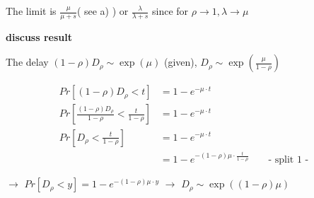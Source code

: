 The limit is $\frac{\mu }{\mu +s}$( see a) ) or $\frac{\lambda }{\lambda +s}$ since for $\rho \rightarrow 1, \lambda \rightarrow \mu$

\textbf{discuss result}

The delay $\left(1-\rho \right)D_{\rho }\sim \exp \left(\mu \right)$ (given),
$D_{\rho }\sim \exp \left(\frac{\mu }{1-\rho }\right)$

\begin{align*}
Pr\left[\left(1-\rho \right)D_{\rho }< t\right]&=1-e^{{-\mu \cdot t}}\\
Pr\left[\frac{\left(1-\rho \right)D_{\rho }}{1-\rho }< \frac{t}{1-\rho }\right]&=1-e^{{-\mu \cdot t}}\\
Pr\left[D_{\rho }< \frac{t}{1-\rho }\right]&=1-e^{{-\mu \cdot t}}\\
&=1-e^{{-\left(1-\rho \right)\mu \cdot \frac{t}{1-\rho }}} && \text{ - split 1 -}
\end{align*}

$\rightarrow$ $Pr\left[D_{\rho }< y\right]=1-e^{{-\left(1-\rho \right)\mu \cdot y}}$
$\rightarrow$ $D_{\rho }\sim \exp \left(\left(1-\rho \right)\mu \right)$

\clearpage